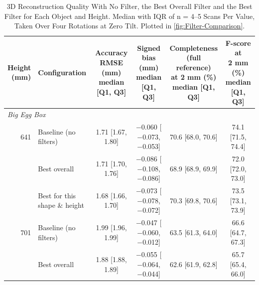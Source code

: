 \begin{table}[H]
	\centering
	\footnotesize
	\setlength{\tabcolsep}{4pt}
	\caption{3D Reconstruction Quality With No Filter, the Best Overall Filter and the Best Filter for Each Object and Height. Median with IQR of n = 4--5 Scans Per Value, Taken Over Four Rotations at Zero Tilt. Plotted in \autoref{fig:Filter-Comparison}.}
	\label{tab:Filter_Comparison}
	\begin{tabular}{r l *{4}{c}}
		\toprule
		\makecell[r]{Height\\(mm)} & Configuration & \makecell{Accuracy\\RMSE (mm)\\{\scriptsize median [Q1, Q3]}} & \makecell{Signed\\bias (mm)\\{\scriptsize median [Q1, Q3]}} & \makecell{Completeness\\(full reference)\\at 2 mm (\%)\\{\scriptsize median [Q1, Q3]}} & \makecell{F-score at\\2 mm (\%)\\{\scriptsize median [Q1, Q3]}} \\
		\midrule
		\multicolumn{6}{l}{\textit{Big Egg Box}} \\
		641 & Baseline (no filters) & 1.71 [1.67, 1.80] & $-$0.060 [$-$0.073, $-$0.053] & 70.6 [68.0, 70.6] & 74.1 [71.5, 74.4] \\
		 & Best overall & 1.71 [1.70, 1.76] & $-$0.086 [$-$0.108, $-$0.086] & 68.9 [68.9, 69.9] & 72.0 [72.0, 73.0] \\
		 & Best for this shape \& height & 1.68 [1.66, 1.70] & $-$0.073 [$-$0.078, $-$0.072] & 70.3 [69.8, 70.6] & 73.5 [73.1, 73.9] \\
		701 & Baseline (no filters) & 1.99 [1.96, 1.99] & $-$0.047 [$-$0.060, $-$0.012] & 63.5 [61.3, 64.0] & 66.6 [64.7, 67.3] \\
		 & Best overall & 1.88 [1.88, 1.89] & $-$0.055 [$-$0.064, $-$0.044] & 62.6 [61.9, 62.8] & 65.7 [65.4, 66.0] \\

\end{tabular}
\end{table}
